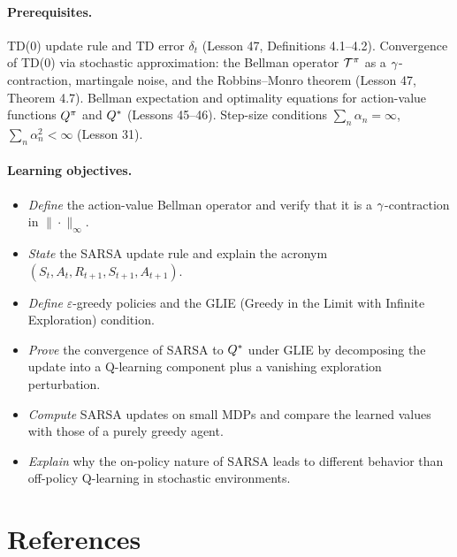 \documentclass[11pt,a4paper]{article}
\begin{document}
\paragraph{Prerequisites.}
TD(0) update rule and TD error $\delta_t$ (Lesson 47,
Definitions 4.1--4.2). Convergence of TD(0) via stochastic
approximation: the Bellman operator $\mathcal{T}^\pi$ as a
$\gamma$-contraction, martingale noise, and the Robbins--Monro
theorem (Lesson 47, Theorem 4.7). Bellman expectation and optimality
equations for action-value functions $Q^{\pi}$ and $Q^*$ (Lessons
45--46). Step-size conditions $\sum_n \alpha_n = \infty$,
$\sum_n \alpha_n^2 < \infty$ (Lesson 31).

\paragraph{Learning objectives.}
\begin{itemize}
  \item \emph{Define} the action-value Bellman operator and verify
    that it is a $\gamma$-contraction in $\|\cdot\|_\infty$.
  \item \emph{State} the SARSA update rule and explain the acronym
    $(S_t, A_t, R_{t+1}, S_{t+1}, A_{t+1})$.
  \item \emph{Define} $\varepsilon$-greedy policies and the GLIE
    (Greedy in the Limit with Infinite Exploration) condition.
  \item \emph{Prove} the convergence of SARSA to $Q^*$ under
    GLIE by decomposing the update into a Q-learning component
    plus a vanishing exploration perturbation.
  \item \emph{Compute} SARSA updates on small MDPs and compare
    the learned values with those of a purely greedy agent.
  \item \emph{Explain} why the on-policy nature of SARSA leads to
    different behavior than off-policy Q-learning in stochastic
    environments.
\end{itemize}

\section{References}
\label{sec:references}
\end{document}

